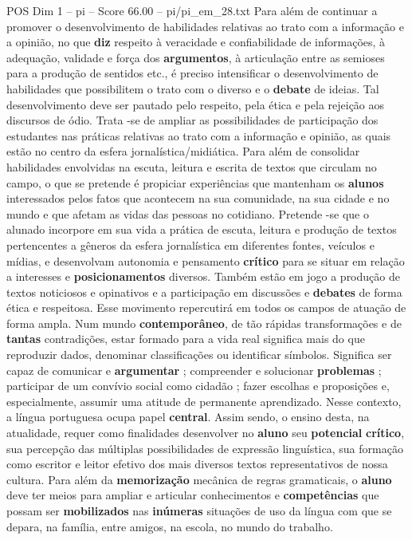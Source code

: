 \begin{textsample}{POS Dim 1 – pi – Score 66.00 – pi/pi\_em\_28.txt}
Para além de continuar a promover o desenvolvimento de habilidades relativas ao trato com a informação e a opinião, no que \textbf{diz} respeito à veracidade e confiabilidade de informações, à adequação, validade e força dos \textbf{argumentos}, à articulação entre as semioses para a produção de sentidos etc., é preciso intensificar o desenvolvimento de habilidades que possibilitem o trato com o diverso e o \textbf{debate} de ideias.
Tal desenvolvimento deve ser pautado pelo respeito, pela ética e pela rejeição aos discursos de ódio.
Trata -se de ampliar as possibilidades de participação dos estudantes nas práticas relativas ao trato com a informação e opinião, as quais estão no centro da esfera jornalística/midiática.
Para além de consolidar habilidades envolvidas na escuta, leitura e escrita de textos que circulam no campo, o que se pretende é propiciar experiências que mantenham os \textbf{alunos} interessados pelos fatos que acontecem na sua comunidade, na sua cidade e no mundo e que afetam as vidas das pessoas no cotidiano.
Pretende -se que o alunado incorpore em sua vida a prática de escuta, leitura e produção de textos pertencentes a gêneros da esfera jornalística em diferentes fontes, veículos e mídias, e desenvolvam autonomia e pensamento \textbf{crítico} para se situar em relação a interesses e \textbf{posicionamentos} diversos.
Também estão em jogo a produção de textos noticiosos e opinativos e a participação em discussões e \textbf{debates} de forma ética e respeitosa.
Esse movimento repercutirá em todos os campos de atuação de forma ampla.
Num mundo \textbf{contemporâneo}, de tão rápidas transformações e de \textbf{tantas} contradições, estar formado para a vida real significa mais do que reproduzir dados, denominar classificações ou identificar símbolos.
Significa ser capaz de comunicar e \textbf{argumentar} ; compreender e solucionar \textbf{problemas} ; participar de um convívio social como cidadão ; fazer escolhas e proposições e, especialmente, assumir uma atitude de permanente aprendizado.
Nesse contexto, a língua portuguesa ocupa papel \textbf{central}.
Assim sendo, o ensino desta, na atualidade, requer como finalidades desenvolver no \textbf{aluno} seu \textbf{potencial} \textbf{crítico}, sua percepção das múltiplas possibilidades de expressão linguística, sua formação como escritor e leitor efetivo dos mais diversos textos representativos de nossa cultura.
Para além da \textbf{memorização} mecânica de regras gramaticais, o \textbf{aluno} deve ter meios para ampliar e articular conhecimentos e \textbf{competências} que possam ser \textbf{mobilizados} nas \textbf{inúmeras} situações de uso da língua com que se depara, na família, entre amigos, na escola, no mundo do trabalho.

\end{textsample}
